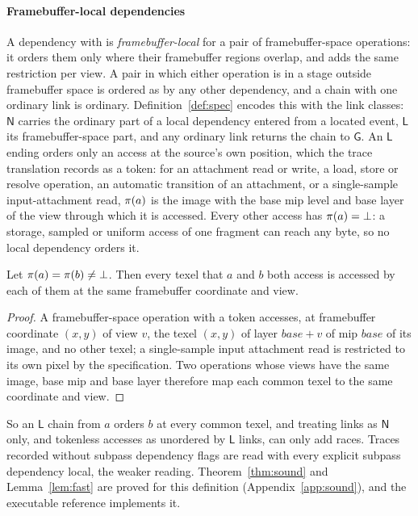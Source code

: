 \paragraph{Framebuffer-local dependencies}
\label{sec:fblocal}
A dependency with  is \emph{framebuffer-local} for a pair of framebuffer-space operations: it orders
them only where their framebuffer regions overlap, and  adds the same restriction per view. A pair
in which either operation is in a stage outside framebuffer space is ordered as by any other dependency, and a chain
with one ordinary link is ordinary. Definition~\ref{def:spec} encodes this with the link classes: $\mathsf{N}$ carries
the ordinary part of a local dependency entered from a located event, $\mathsf{L}$ its framebuffer-space part, and any
ordinary link returns the chain to $\mathsf{G}$. An $\mathsf{L}$ ending orders only an access at the source's own
position, which the trace translation records as a token: for an attachment read or write, a load, store or resolve
operation, an automatic transition of an attachment, or a single-sample input-attachment read, $\pi(a)$ is the image
with the base mip level and base layer of the view through which it is accessed. Every other access has
$\pi(a) = \bot$: a storage, sampled or uniform access of one fragment can reach any byte, so no local dependency
orders it.

\begin{lemma}\label{lem:tokens}
Let $\pi(a) = \pi(b) \ne \bot$. Then every texel that $a$ and $b$ both access is accessed by each of them at the
same framebuffer coordinate and view.
\end{lemma}
\begin{proof}
A framebuffer-space operation with a token accesses, at framebuffer coordinate $(x,y)$ of view $v$, the texel
$(x,y)$ of layer $\mathit{base}+v$ of mip $\mathit{base}$ of its image, and no other texel; a single-sample input
attachment read is restricted to its own pixel by the specification. Two operations whose views have the same image,
base mip and base layer therefore map each common texel to the same coordinate and view.
\end{proof}

So an $\mathsf{L}$ chain from $a$ orders $b$ at every common texel, and treating  links as $\mathsf{N}$
only, and tokenless accesses as unordered by $\mathsf{L}$ links, can only add races. Traces recorded without subpass
dependency flags are read with every explicit subpass dependency local, the weaker reading. Theorem~\ref{thm:sound}
and Lemma~\ref{lem:fast} are proved for this definition (Appendix~\ref{app:sound}), and the executable reference
implements it.

